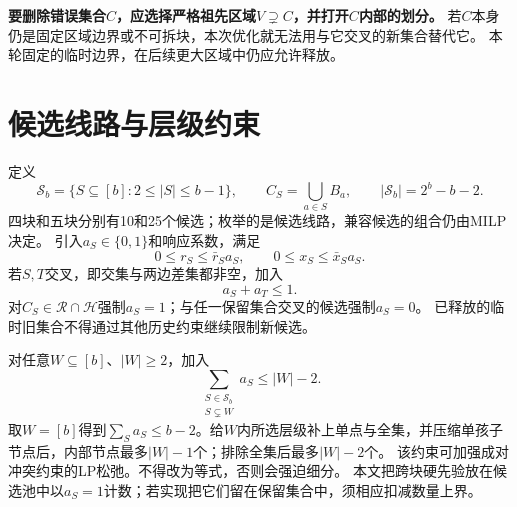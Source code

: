 \documentclass[UTF8,a4paper,11pt,fontset=windows]{ctexart}
\newcommand{\Hh}{\mathcal H}
\begin{document}
\textbf{要删除错误集合$C$，应选择严格祖先区域$V\supsetneq C$，并打开$C$内部的划分。}
若$C$本身仍是固定区域边界或不可拆块，本次优化就无法用与它交叉的新集合替代它。
本轮固定的临时边界，在后续更大区域中仍应允许释放。

\section{候选线路与层级约束}
定义
\begin{equation}
 \mathcal S_b=\{S\subseteq[b]:2\le|S|\le b-1\},\qquad
 C_S=\bigcup_{a\in S}B_a,\qquad |\mathcal S_b|=2^b-b-2.
\end{equation}
四块和五块分别有10和25个候选；枚举的是候选线路，兼容候选的组合仍由MILP决定。
引入$a_S\in\{0,1\}$和响应系数，满足
\begin{equation}
 0\le r_S\le\bar r_Sa_S,\qquad 0\le x_S\le\bar x_Sa_S.
\end{equation}
若$S,T$交叉，即交集与两边差集都非空，加入
\begin{equation}
 a_S+a_T\le1.
\end{equation}
对$C_S\in\mathcal R\cap\Hh$强制$a_S=1$；与任一保留集合交叉的候选强制$a_S=0$。
已释放的临时旧集合不得通过其他历史约束继续限制新候选。

对任意$W\subseteq[b]$、$|W|\ge2$，加入
\begin{equation}
 \boxed{\sum_{\substack{S\in\mathcal S_b\\S\subsetneq W}}a_S\le|W|-2.}
\end{equation}
取$W=[b]$得到$\sum_Sa_S\le b-2$。给$W$内所选层级补上单点与全集，并压缩单孩子节点后，内部节点最多$|W|-1$个；排除全集后最多$|W|-2$个。
该约束可加强成对冲突约束的LP松弛。不得改为等式，否则会强迫细分。
本文把跨块硬先验放在候选池中以$a_S=1$计数；若实现把它们留在保留集合中，须相应扣减数量上界。
\end{document}

